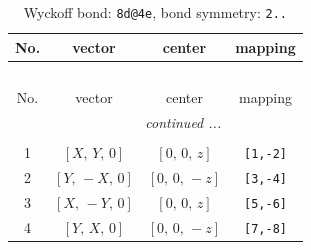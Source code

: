 \documentclass[fleqn,8pt]{jsarticle}
\begin{document}
\renewcommand{\arraystretch}{1.2}
\begin{longtable}{cccc}
\caption{Wyckoff bond: {\tt 8d@4e}, bond symmetry: {\tt 2..}}
 \\
 \hline \hline
No. & vector & center & mapping \\ \hline \endfirsthead

\multicolumn{3}{l}{\tablename\ \thetable{}} \\
 \hline \hline
No. & vector & center & mapping \\ \hline \endhead

 \hline \hline
\multicolumn{3}{r}{\footnotesize\it continued ...} \\ \endfoot

 \hline \hline
\multicolumn{3}{r}{} \\ \endlastfoot

1 & $\left[ X,\, Y,\, 0 \right]$ & $\left[ 0,\, 0,\, z \right]$ & {\tt [1,-2]} \\ \hline
2 & $\left[ Y,\, - X,\, 0 \right]$ & $\left[ 0,\, 0,\, - z \right]$ & {\tt [3,-4]} \\ \hline
3 & $\left[ X,\, - Y,\, 0 \right]$ & $\left[ 0,\, 0,\, z \right]$ & {\tt [5,-6]} \\ \hline
4 & $\left[ Y,\, X,\, 0 \right]$ & $\left[ 0,\, 0,\, - z \right]$ & {\tt [7,-8]} \\
\end{longtable}
\renewcommand{\arraystretch}{1.2}
\end{document}
